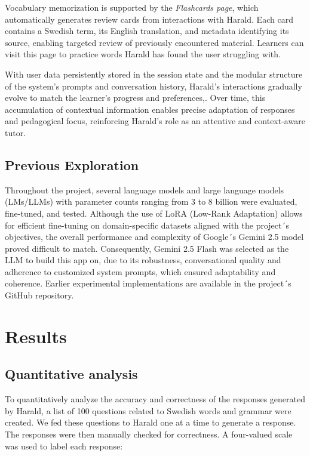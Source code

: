 \documentclass[a4paper,10pt]{article}
\begin{document}
Vocabulary memorization is supported by the \textit{Flashcards page}, which automatically generates review cards from interactions with Harald. Each card contains a Swedish term, its English translation, and metadata identifying its source, enabling targeted review of previously encountered material. Learners can visit this page to practice words Harald has found the user struggling with.

With user data persistently stored in the session state and the modular structure of the system’s prompts and conversation history, Harald’s interactions gradually evolve to match the learner’s progress and preferences,. Over time, this accumulation of contextual information enables precise adaptation of responses and pedagogical focus, reinforcing Harald’s role as an attentive and context-aware tutor.

\subsection{Previous Exploration}
Throughout the project, several language models and large language models (LMs/LLMs) with parameter counts ranging from 3 to 8 billion were evaluated, fine-tuned, and tested. Although the use of LoRA (Low-Rank Adaptation) allows for efficient fine-tuning on domain-specific datasets aligned with the project´s objectives, the overall performance and complexity of Google´s Gemini 2.5 model proved difficult to match. Consequently, Gemini 2.5 Flash was selected as the LLM to build this app on, due to its robustness, conversational quality and adherence to customized system prompts, which ensured adaptability and coherence. Earlier experimental implementations are available in the project´s GitHub repository.

\section{Results}

\subsection{Quantitative analysis}

To quantitatively analyze the accuracy and correctness of the responses generated by Harald, a list of 100 questions related to Swedish words and grammar were created. We fed these questions to Harald one at a time to generate a response. The responses were then manually checked for correctness. A four-valued scale was used to label each response:
\end{document}
